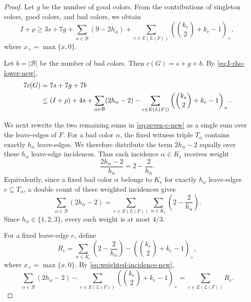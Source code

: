 \documentclass[10pt,a4paper]{article}
\theoremstyle{definition}
\newcommand{\cB}{\mathcal{B}}
\begin{document}
\begin{proof}
    Let $g$ be the number of good colors.  From the contributions of singleton
    colors, good colors, and bad colors, we obtain
    \begin{equation}\label{eq:I-rho-lower-new}
        I+\rho
        \ge
        3s+7g
        +
        \sum_{\alpha\in\cB}(9-2h_\alpha)
        +
        \sum_{e\in E(L(F))}
        \left(\binom{k_e}{2}+k_e-1\right)_+,
    \end{equation}
    where $x_+=\max\{x,0\}$.

    Let $b=|\cB|$ be the number of bad colors.  Then $c(G)=s+g+b$.
    By \eqref{eq:I-rho-lower-new},
    \begin{align}
        7c(G)
         & =
        7s+7g+7b \notag \\
         & \le
        (I+\rho)+4s
        +
        \sum_{\alpha\in\cB}(2h_\alpha-2)
        -
        \sum_{e\in E(L(F))}
        \left(\binom{k_e}{2}+k_e-1\right)_+.
        \label{eq:seven-c-new}
    \end{align}

    We next rewrite the two remaining sums in \eqref{eq:seven-c-new} as a
    single sum over the leave-edges of \(F\).  For a bad color \(\alpha\), the
    fixed witness triple \(T_\alpha\) contains exactly \(h_\alpha\)
    leave-edges.  We therefore distribute the term \(2h_\alpha-2\) equally
    over these \(h_\alpha\) leave-edge incidences.  Thus each incidence
    \(\alpha\in K_e\) receives weight
    \[
        \frac{2h_\alpha-2}{h_\alpha}
        =
        2-\frac2{h_\alpha}.
    \]
    Equivalently, since a fixed bad color \(\alpha\) belongs to \(K_e\) for
    exactly \(h_\alpha\) leave-edges \(e\subseteq T_\alpha\), a double count
    of these weighted incidences gives
    \begin{equation}\label{eq:weighted-incidence-new}
        \sum_{\alpha\in\cB}(2h_\alpha-2)
        =
        \sum_{e\in E(L(F))}
        \sum_{\alpha\in K_e}
        \left(2-\frac2{h_\alpha}\right).
    \end{equation}
    Since \(h_\alpha\in\{1,2,3\}\), every such weight is at most \(4/3\).

    For a fixed leave-edge \(e\), define
    \[
        R_e=
        \sum_{\alpha\in K_e}
        \left(2-\frac2{h_\alpha}\right)
        -
        \left(\binom{k_e}{2}+k_e-1\right)_+,
    \]
    where $x_+=\max\{x,0\}$.
    By \eqref{eq:weighted-incidence-new},
    \begin{equation}
        \sum_{\alpha\in\cB}(2h_\alpha-2)
        -
        \sum_{e\in E(L(F))}
        \left(\binom{k_e}{2}+k_e-1\right)_+
        =
        \sum_{e\in E(L(F))}R_e.
    \end{equation}



\end{proof}
\end{document}
